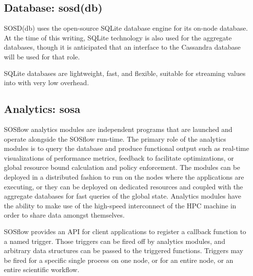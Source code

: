 \subsection{Database: sosd(db)} %
%
SOSD(db) uses the open-source SQLite database engine for its on-node
database.
%
At the time of this writing, SQLite technology is also used for the
aggregate databases, though it is anticipated that an interface to the
Cassandra database will be used for that role.
%
\par
%
SQLite databases are lightweight, fast, and flexible, suitable for
streaming values into with very low overhead.


\subsection{Analytics: sosa} %
%
SOSflow analytics modules are independent programs that are launched
and operate alongside the SOSflow run-time.
%
The primary role of the analytics modules is to query the database
and produce functional output such as real-time visualizations of
performance metrics, feedback to facilitate optimizations, or
global resource bound calculation and policy enforcement.
%
The modules can be deployed in a distributed fashion to run on the nodes
where the applications are executing, or they can be deployed on dedicated
resources and coupled with the aggregate databases for fast queries
of the global state.
%
Analytics modules have the ability to make use of the high-speed
interconnect of the HPC machine in order to share data amongst themselves.
%
\par
%
SOSflow provides an API for client applications to register
a callback function to a named trigger.
%
Those triggers can be fired off by analytics modules, and arbitrary
data structures can be passed to the triggered functions.
%
Triggers may be fired for a specific single process on one node,
or for an entire node, or an entire scientific workflow.
